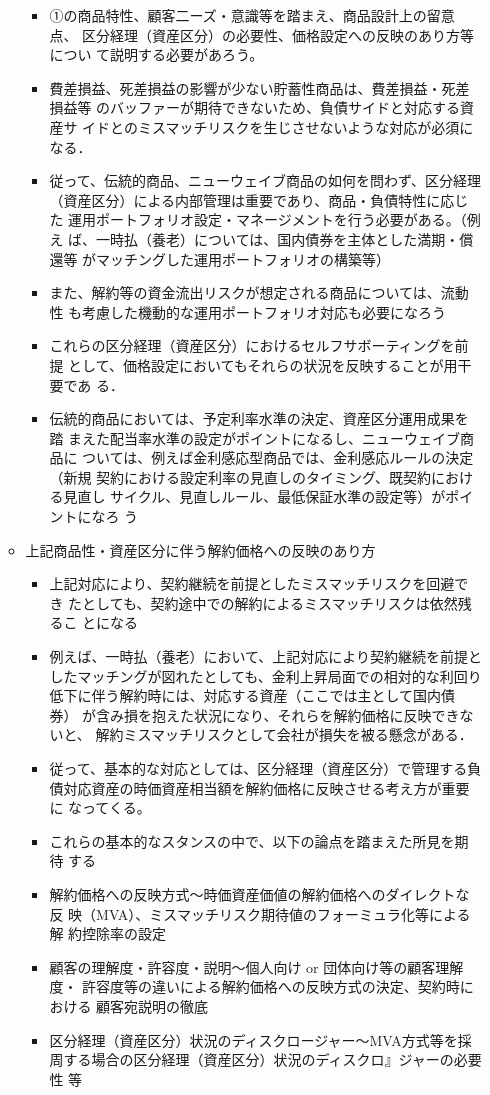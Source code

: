 \documentclass[report,gutter=10mm,fore-edge=10mm,uplatex,dvipdfmx]{jlreq}
\begin{document}
\begin{enumerate}
\begin{itemize}
\begin{itemize}
 \item ①の商品特性、顧客二ーズ・意識等を踏まえ、商品設計上の留意点、
区分経理（資産区分）の必要性、価格設定への反映のあり方等につい
て説明する必要があろう。
 \item 費差損益、死差損益の影響が少ない貯蓄性商品は、費差損益・死差損益等
のバッファーが期待できないため、負債サイドと対応する資産サ
イドとのミスマッチリスクを生じさせないような対応が必須になる．
 \item 従って、伝統的商品、ニューウェイブ商品の如何を問わず、区分経理
（資産区分）による内部管理は重要であり、商品・負債特性に応じた
運用ポートフォリオ設定・マネージメントを行う必要がある。（例え
ば、一時払（養老）については、国内債券を主体とした満期・償還等
がマッチングした運用ポートフォリオの構築等）
 \item また、解約等の資金流出リスクが想定される商品については、流動性
も考慮した機動的な運用ポートフォリオ対応も必要になろう
 \item これらの区分経理（資産区分）におけるセルフサボーティングを前提
として、価格設定においてもそれらの状況を反映することが用干要であ
る．
 \item 伝統的商品においては、予定利率水準の決定、資産区分運用成果を踏
まえた配当率水準の設定がポイントになるし、ニューウェイブ商品に
ついては、例えば金利感応型商品では、金利感応ルールの決定（新規
契約における設定利率の見直しのタイミング、既契約における見直し
サイクル、見直しルール、最低保証水準の設定等）がポイントになろ
う
\end{itemize}
 \item 上記商品性・資産区分に伴う解約価格への反映のあり方
\begin{itemize}
 \item 上記対応により、契約継続を前提としたミスマッチリスクを回避でき
たとしても、契約途中での解約によるミスマッチリスクは依然残るこ
とになる
 \item 例えば、一時払（養老）において、上記対応により契約継続を前提と
したマッチングが図れたとしても、金利上昇局面での相対的な利回り
低下に伴う解約時には、対応する資産（ここでは主として国内債券）
が含み損を抱えた状況になり、それらを解約価格に反映できないと、
解約ミスマッチリスクとして会社が損失を被る懸念がある．
 \item 従って、基本的な対応としては、区分経理（資産区分）で管理する負
債対応資産の時価資産相当額を解約価格に反映させる考え方が重要に
なってくる。
 \item これらの基本的なスタンスの中で、以下の論点を踏まえた所見を期待
する
 \item 解約価格への反映方式〜時価資産価値の解約価格へのダイレクトな反
映（MVA）、ミスマッチリスク期待値のフォーミュラ化等による解
約控除率の設定
 \item 顧客の理解度・許容度・説明〜個人向け or 団体向け等の顧客理解度・
許容度等の違いによる解約価格への反映方式の決定、契約時における
顧客宛説明の徹底
 \item 区分経理（資産区分）状況のディスクロージャー〜MVA方式等を採
周する場合の区分経理（資産区分）状況のディスクロ』ジャーの必要
性 等
\end{itemize}
\end{itemize}
\end{enumerate}
\end{document}
